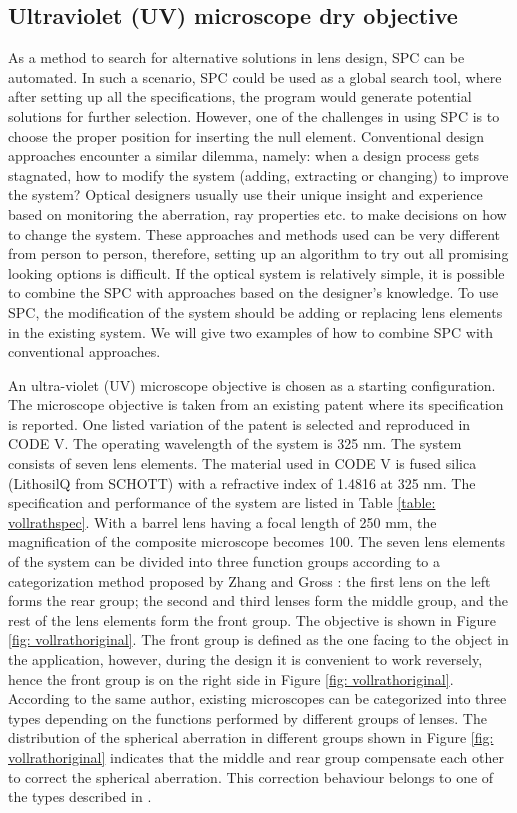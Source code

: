 \subsection{Ultraviolet (UV) microscope dry objective}
As a method to search for alternative solutions in lens design, SPC can be automated. In such a scenario, SPC could be used as a global search tool, where after setting up all the specifications, the program would generate potential solutions for further selection. However, one of the challenges in using SPC is to choose the proper position for inserting the null element. Conventional design approaches encounter a similar dilemma, namely: when a design process gets stagnated, how to modify the system (adding, extracting or changing) to improve the system? Optical designers usually use their unique insight and experience based on monitoring the aberration, ray properties etc. to make decisions on how to change the system. These approaches and methods used can be very different from person to person, therefore, setting up an algorithm to try out all promising looking options is difficult. If the optical system is relatively simple, it is possible to combine the SPC with approaches based on the designer's knowledge. To use SPC, the modification of the system should be adding or replacing lens elements in the existing system. We will give two examples of how to combine SPC with conventional approaches. 

An ultra-violet (UV) microscope objective is chosen as a starting configuration. The microscope objective is taken from an existing patent\cite{patentvollrath} where its specification is reported. One listed variation of the patent is selected and reproduced in CODE V. The operating wavelength of the system is 325 nm. The system consists of seven lens elements. The material used in CODE V is fused silica (LithosilQ from SCHOTT) with a refractive index of 1.4816 at 325 nm. The specification and performance of the system are listed in Table \ref{table: vollrathspec}. With a barrel lens having a focal length of 250 mm, the magnification of the composite microscope becomes 100. The seven lens elements of the system can be divided into three function groups according to a categorization method proposed by Zhang and Gross \cite{ZhangMicroscope2017}: the first lens on the left forms the rear group; the second and third lenses form the middle group, and the rest of the lens elements form the front group. The objective is shown in Figure \ref{fig: vollrathoriginal}. The front group is defined as the one facing to the object in the application, however, during the design it is convenient to work reversely, hence the front group is on the right side in Figure \ref{fig: vollrathoriginal}. According to the same author, existing microscopes can be categorized into three types depending on the functions performed by different groups of lenses. The distribution of the spherical aberration in different groups shown in Figure \ref{fig: vollrathoriginal} indicates that the middle and rear group compensate each other to correct the spherical aberration. This correction behaviour belongs to one of the types described in \cite{ZhangMicroscope2017}.

